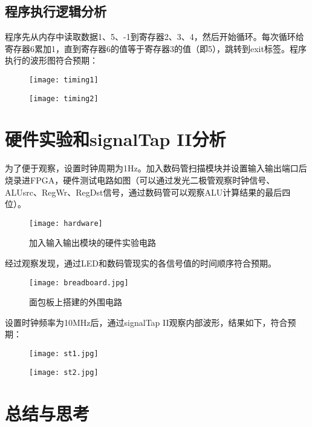 \documentclass{hfutpaper}
\begin{document}
\subsection{程序执行逻辑分析}

\par 程序先从内存中读取数据1、5、-1到寄存器2、3、4，然后开始循环。每次循环给寄存器6累加1，直到寄存器6的值等于寄存器3的值（即5），跳转到exit标签。程序执行的波形图符合预期：
\begin{figure}[H]
	\centering
	\texttt{[image: timing1]}
\end{figure}
\begin{figure}[H]
	\centering
	\texttt{[image: timing2]}
\end{figure}


\section{硬件实验和signalTap II分析}

\par 为了便于观察，设置时钟周期为1Hz。加入数码管扫描模块并设置输入输出端口后烧录进FPGA，硬件测试电路如图（可以通过发光二极管观察时钟信号、ALUsrc、RegWr、RegDst信号，通过数码管可以观察ALU计算结果的最后四位）。

\begin{figure}[H]
	\centering
	\texttt{[image: hardware]}
	\caption{加入输入输出模块的硬件实验电路}
\end{figure}

\par 经过观察发现，通过LED和数码管现实的各信号值的时间顺序符合预期。
\begin{figure}[H]
	\centering
	\texttt{[image: breadboard.jpg]}
	\caption{面包板上搭建的外围电路}
\end{figure}

\par 设置时钟频率为10MHz后，通过signalTap II观察内部波形，结果如下，符合预期：

\begin{figure}[H]
	\centering
	\texttt{[image: st1.jpg]}
\end{figure}
\begin{figure}[H]
	\centering
	\texttt{[image: st2.jpg]}
\end{figure}


\section{总结与思考}
\end{document}
